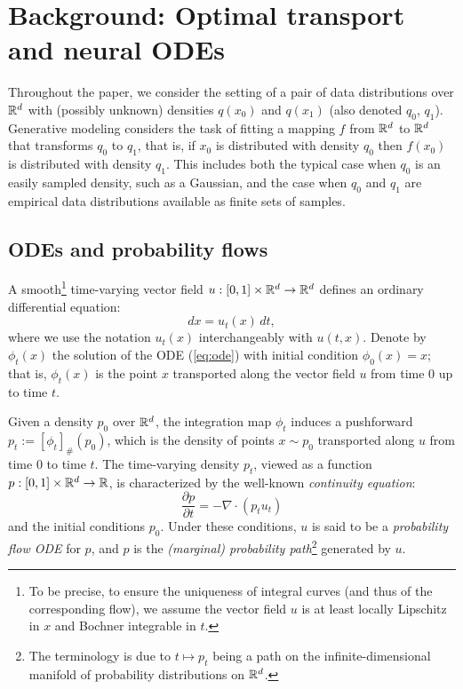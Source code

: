 \documentclass[10pt]{article}
\theoremstyle{plain}
\theoremstyle{definition}
\theoremstyle{remark}
\begin{document}
\section{Background: Optimal transport and neural ODEs}\label{sec:new_background}

Throughout the paper, we consider the setting of a pair of data distributions over $\mathbb{R}^d$ with (possibly unknown) densities $q(x_0)$ and $q(x_1)$ (also denoted $q_0$, $q_1$). Generative modeling considers the task of fitting a mapping $f$ from $\mathbb{R}^d$ to $\mathbb{R}^d$ that transforms $q_0$ to $q_1$, that is, if $x_0$ is distributed with density $q_0$ then $f(x_0)$ is distributed with density $q_1$. This includes both the typical case when $q_0$ is an easily sampled density, such as a Gaussian, and the case when $q_0$ and $q_1$ are empirical data distributions available as finite sets of samples.

\subsection{ODEs and probability flows} \label{sec:odes}

A smooth\footnote{To be precise, to ensure the uniqueness of integral curves (and thus of the corresponding flow), we assume the vector field $u$ is at least locally Lipschitz in $x$ and Bochner integrable in $t$.} time-varying vector field $u : [0, 1] \times \mathbb{R}^d \to \mathbb{R}^d$ defines an ordinary differential equation:
 \begin{equation}\label{eq:ode}
dx = u_t(x)\,dt,
\end{equation}
where we use the notation $u_t(x)$ interchangeably with $u(t,x)$. 
Denote by $\phi_t(x)$ the solution of the ODE (\ref{eq:ode}) with initial condition $\phi_0(x)=x$; that is, $\phi_t(x)$ is the point $x$ transported along the vector field $u$ from time $0$ up to time $t$.

Given a density $p_0$ over $\mathbb{R}^d$, the integration map $\phi_t$ induces a pushforward $p_t:=[\phi_t]_\#(p_0)$, which is the density of points $x\sim p_0$ transported along $u$ from time $0$ to time $t$. The time-varying density $p_t$, viewed as a function $p:[0,1]\times\mathbb{R}^d\to\mathbb{R}$, is characterized by the well-known \emph{continuity equation}:
\begin{equation}\label{eq:continuity}
\frac{\partial p}{\partial t}=-\nabla\cdot(p_tu_t)
\end{equation}
and the initial conditions $p_0$. Under these conditions, $u$ is said to be a \emph{probability flow ODE} for $p$, and $p$ is the \emph{(marginal) probability path}\footnote{The terminology is due to $t\mapsto p_t$ being a path on the infinite-dimensional manifold of probability distributions on $\mathbb{R}^d$.} generated by $u$.
\end{document}
